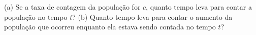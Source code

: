 (a) Se a taxa de contagem da população for $c$, quanto tempo leva para contar a população no tempo $t$? (b) Quanto tempo leva para contar o aumento da população que ocorreu enquanto ela estava sendo contada no tempo $t$?
